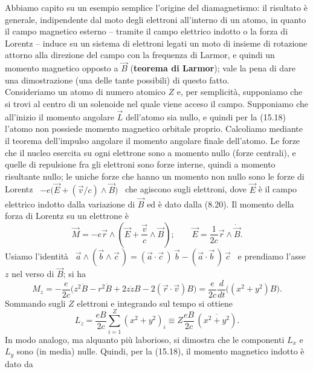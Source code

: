 Abbiamo capito su un esempio semplice l'origine del diamagnetismo: il risultato
\`e generale, indipendente dal moto degli elettroni all'interno di un atomo, in
quanto il campo magnetico esterno -- tramite il campo elettrico indotto o la
forza di Lorentz -- induce su un sistema di elettroni legati un moto di insieme
di rotazione attorno alla direzione del campo con la frequenza di Larmor, e
quindi un momento magnetico opposto a $\vec B$ (\textbf{teorema di Larmor});
vale la pena di dare una dimostrazione (una delle tante possibili) di questo
fatto.\\
Consideriamo un atomo di numero atomico $Z$ e, per semplicit\`a, supponiamo che
si trovi al centro di un solenoide nel quale viene acceso il campo. Supponiamo
che all'inizio il momento angolare $\vec L$ dell'atomo sia nullo, e quindi per
la (15.18) l'atomo non possiede momento magnetico orbitale proprio. Calcoliamo
mediante il teorema dell'impulso angolare il momento angolare finale dell'atomo.
Le forze che il nucleo esercita su ogni elettrone sono a momento nullo (forze
centrali), e quelle di repulsione fra gli elettroni sono forze interne, quindi a
momento risultante nullo; le uniche forze che hanno un momento non nullo sono le
forze di Lorentz \ $-e\big(\vec E+(\vec v/c)\wedge\vec B\big)$ \ che agiscono
sugli elettroni, dove $\vec E$ \`e il campo elettrico indotto dalla variazione
di $\vec B$ ed \`e dato dalla (8.20). Il momento della forza di Lorentz su un
elettrone \`e
\begin{equation}
  \vec M=-e\vec r\wedge(\vec E+\frac{\vec v}{c}\wedge\vec B);
  \qquad\vec E=\frac{1}{2c}\vec r\wedge\dot{\vec B}.
  \tag{15.27}
\end{equation}
Usiamo l'identit\`a \ $\vec a\wedge(\vec b\wedge\vec c\,)
=(\vec a\cdot\vec c\,)\,\vec b-(\vec a\cdot\vec b\,)\,\vec c$ \ e prendiamo
l'asse $z$ nel verso di $\vec B$; si ha
\begin{equation}
  M_z=-\frac{e}{2c}\Big(z^2\dot B-r^2\dot B+2z\dot zB-2(\vec r\cdot\vec v)B\Big)
  =\frac{e}{2c}\frac{d}{dt}\Big((x^2+y^2)B\Big).
  \tag{15.28}
\end{equation}
Sommando sugli $Z$ elettroni e integrando sul tempo si ottiene
\begin{equation}
  L_z=\frac{eB}{2c}\sum_{i=1}^Z(x^2+y^2)_i
  \equiv Z\frac{eB}{2c}\,(\overline{x^2+y^2}).
  \tag{15.29}
\end{equation}
In modo analogo, ma alquanto pi\`u laborioso, si dimostra che le componenti
$L_x$ e $L_y$ sono (in media) nulle. Quindi, per la (15.18), il momento
magnetico indotto \`e dato da
